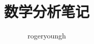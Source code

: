 \documentclass{probook}
\title{数学分析笔记}
\author{rogeryoungh}
\begin{document}
\newcommand\mfrac[2]{\dfrac{#1\smash[b]{\strut}}{#2\smash[t]{\strut}}}
\newcommand\RR{\mathbb{R}}
\newcommand\NN{\mathbb{N}}
\newcommand\QQ{\mathbb{Q}}
\newcommand\ZZ{\mathbb{Z}}
\newcommand\ee{\mathrm{e}}
\newcommand\dd{\mathrm{d}}
\newcommand\uppi{\mathrm{\pi}}

\newcommand\dom{\operatorname{\mathbf{Dom}}}
\newcommand\im{\operatorname{\mathbf{Im}}}
\newcommand\graph{\operatorname{\mathbf{graph}}}
\newcommand\LIM{\operatorname{{LIM}}}

\newcommand\num[1]{{\fzfs{（}}{\rm{#1}}{\fzfs{）}}}

\maketitle

\frontmatter

\tableofcontents

\mainmatter

\end{document}
